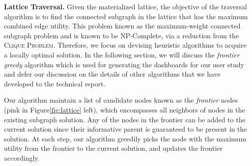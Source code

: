 \textbf{Lattice Traversal.} Given the materialized lattice, the objective of the traversal algorithm is to find the connected subgraph in the lattice that has the maximum combined edge utility. This problem known as the maximum-weight connected subgraph problem\cite{ErnstAlthaus2009} and is known to be NP-Complete, via a reduction from the \textsc{Clique Problem}. Therefore, we focus on devising heuristic algorithms to acquire a locally optimal solution. In the following section, we will discuss the \textit{frontier greedy} algorithm which is used for generating the dashboards for our user study and defer our discussion on the details of other algorithms that we have developed to the technical report.
\par Our algorithm maintain a list of candidate nodes known as the \textit{frontier} nodes (pink in Figure\ref{fig:lattice} left), which encompasses all neighbors of nodes in the existing subgraph solution. Any of the nodes in the frontier can be added to the current solution since their informative parent is guaranteed to be present in the solution. At each step, our algorithm greedily picks the node with the maximum utility from the frontier to the current solution, and updates the frontier accordingly.
